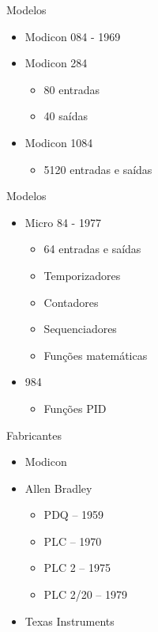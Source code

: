 \documentclass[aspectratio=169,
				xcolor=table]{beamer}
\begin{document}
	\begin{frame}{Modelos}
		\begin{itemize}
			\item Modicon 084 - 1969
			\item Modicon 284
			\begin{itemize}
				\item 80 entradas
				\item 40 saídas
			\end{itemize}
			\item Modicon 1084
			\begin{itemize}
				\item 5120 entradas e saídas
			\end{itemize}
		\end{itemize}
	\end{frame}	
	
	\begin{frame}{Modelos}
	
		\begin{itemize}
			\item Micro 84 - 1977
			\begin{itemize}
				\item 64 entradas e saídas
				\item Temporizadores
				\item Contadores
				\item Sequenciadores
				\item Funções matemáticas
			\end{itemize}
			\vspace{1em}
			\item 984
			\begin{itemize}
				\item Funções PID
			\end{itemize}
		\end{itemize}
		
	\end{frame}
	
	\begin{frame}{Fabricantes}
		\begin{itemize}
			\item Modicon
			\vspace{1em}
			\item Allen Bradley
			\begin{itemize}
				\item PDQ – 1959
				\item PLC – 1970
				\item PLC 2 – 1975
				\item PLC 2/20 – 1979

			\end{itemize}
			\vspace{1em}
			\item Texas Instruments
			
		\end{itemize}
	\end{frame}
	
\end{document}
